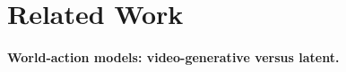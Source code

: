 
\section{Related Work}
\label{sec:related}

\paragraph{World-action models: video-generative versus latent.}
